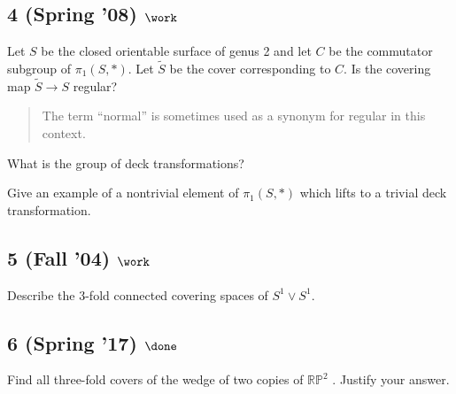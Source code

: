 \hypertarget{spring-08-work-1}{%
\subsection{\texorpdfstring{4 (Spring '08)
\(\work\)}{4 (Spring '08) \textbackslash work}}\label{spring-08-work-1}}

Let \(S\) be the closed orientable surface of genus 2 and let \(C\) be
the commutator subgroup of \(\pi_1 (S, \ast)\). Let \(\tilde S\) be the
cover corresponding to \(C\). Is the covering map \(\tilde S \to S\)
regular?

\begin{quote}
The term ``normal'' is sometimes used as a synonym for regular in this
context.
\end{quote}

What is the group of deck transformations?

Give an example of a nontrivial element of \(\pi_1 (S, \ast)\) which
lifts to a trivial deck transformation.

\hypertarget{fall-04-work-2}{%
\subsection{\texorpdfstring{5 (Fall '04)
\(\work\)}{5 (Fall '04) \textbackslash work}}\label{fall-04-work-2}}

Describe the 3-fold connected covering spaces of \(S^1 \lor S^1\).

\hypertarget{spring-17-done}{%
\subsection{\texorpdfstring{6 (Spring '17)
\(\done\)}{6 (Spring '17) \textbackslash done}}\label{spring-17-done}}

Find all three-fold covers of the wedge of two copies of
\({\mathbb{RP}}^2\) . Justify your answer.

